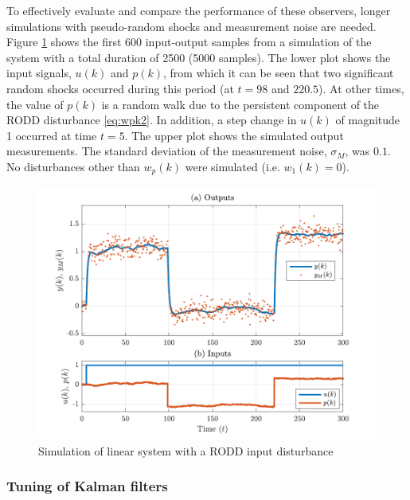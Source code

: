 To effectively evaluate and compare the performance of these observers, longer simulations with pseudo-random shocks and measurement noise are needed. Figure \ref{fig:rod-obs-sim1-ioplot} shows the first 600 input-output samples from a simulation of the system with a total duration of 2500 (5000 samples). The lower plot shows the input signals, $u(k)$ and $p(k)$, from which it can be seen that two significant random shocks occurred during this period (at $t=98$ and $220.5$). At other times, the value of $p(k)$ is a random walk due to the persistent component of the \gls{RODD} disturbance \eqref{eq:wpk2}. In addition, a step change in $u(k)$ of magnitude 1 occurred at time $t=5$. The upper plot shows the simulated output measurements. The standard deviation of the measurement noise, $\sigma_M$, was $0.1$. No disturbances other than $w_p(k)$ were simulated (i.e. $w_1(k)=0$).
\begin{figure}[htp]
	\centering
	\includegraphics[width=13cm]{images/rod_obs_sim1_all_seed_ioplot.pdf}
	\caption{Simulation of linear system with a \gls{RODD} input disturbance}
	\label{fig:rod-obs-sim1-ioplot}
\end{figure}

\subsubsection{Tuning of Kalman filters} \label{sec:sim-obs-lin-1-KF-tuning}

